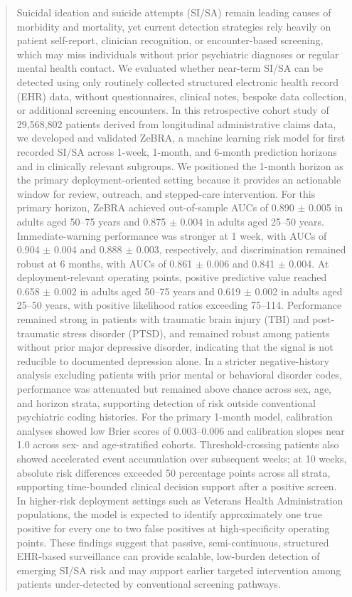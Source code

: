 \documentclass[onecolumn, compsoc,11pt]{IEEEtran}
\begin{document}
\begin{abstract}
Suicidal ideation and suicide attempts (SI/SA) remain leading causes of morbidity and mortality, yet current detection strategies rely heavily on patient self-report, clinician recognition, or encounter-based screening, which may miss individuals without prior psychiatric diagnoses or regular mental health contact. We evaluated whether near-term SI/SA can be detected using only routinely collected structured electronic health record (EHR) data, without questionnaires, clinical notes, bespoke data collection, or additional screening encounters. In this retrospective cohort study of 29,568,802 patients derived from longitudinal administrative claims data, we developed and validated ZeBRA, a machine learning risk model for first recorded SI/SA across 1-week, 1-month, and 6-month prediction horizons and in clinically relevant subgroups. We positioned the 1-month horizon as the primary deployment-oriented setting because it provides an actionable window for review, outreach, and stepped-care intervention. For this primary horizon, ZeBRA achieved out-of-sample AUCs of 0.890 $\pm$ 0.005 in adults aged 50--75 years and 0.875 $\pm$ 0.004 in adults aged 25--50 years. Immediate-warning performance was stronger at 1 week, with AUCs of 0.904 $\pm$ 0.004 and 0.888 $\pm$ 0.003, respectively, and discrimination remained robust at 6 months, with AUCs of 0.861 $\pm$ 0.006 and 0.841 $\pm$ 0.004. At deployment-relevant operating points, positive predictive value reached 0.658 $\pm$ 0.002 in adults aged 50--75 years and 0.619 $\pm$ 0.002 in adults aged 25--50 years, with positive likelihood ratios exceeding 75--114. Performance remained strong in patients with traumatic brain injury (TBI) and post-traumatic stress disorder (PTSD), and remained robust among patients without prior major depressive disorder, indicating that the signal is not reducible to documented depression alone. In a stricter negative-history analysis excluding patients with prior mental or behavioral disorder codes, performance was attenuated but remained above chance across sex, age, and horizon strata, supporting detection of risk outside conventional psychiatric coding histories. For the primary 1-month model, calibration analyses showed low Brier scores of 0.003--0.006 and calibration slopes near 1.0 across sex- and age-stratified cohorts. Threshold-crossing patients also showed accelerated event accumulation over subsequent weeks; at 10 weeks, absolute risk differences exceeded 50 percentage points across all strata, supporting time-bounded clinical decision support after a positive screen. In higher-risk deployment settings such as Veterans Health Administration populations, the model is expected to identify approximately one true positive for every one to two false positives at high-specificity operating points. These findings suggest that passive, semi-continuous, structured EHR-based surveillance can provide scalable, low-burden detection of emerging SI/SA risk and may support earlier targeted intervention among patients under-detected by conventional screening pathways.
\end{abstract}
\end{document}
